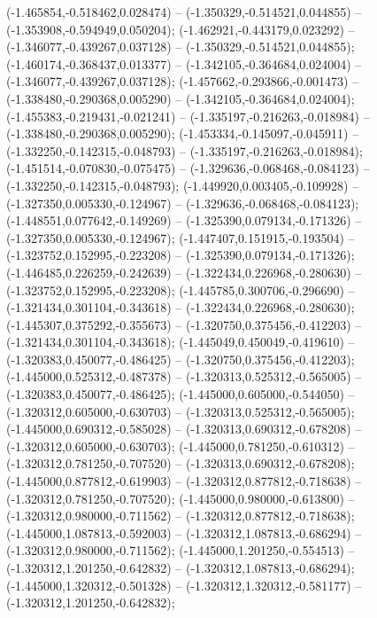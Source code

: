  (-1.465854,-0.518462,0.028474) -- (-1.350329,-0.514521,0.044855) -- (-1.353908,-0.594949,0.050204);
 (-1.462921,-0.443179,0.023292) -- (-1.346077,-0.439267,0.037128) -- (-1.350329,-0.514521,0.044855);
 (-1.460174,-0.368437,0.013377) -- (-1.342105,-0.364684,0.024004) -- (-1.346077,-0.439267,0.037128);
 (-1.457662,-0.293866,-0.001473) -- (-1.338480,-0.290368,0.005290) -- (-1.342105,-0.364684,0.024004);
 (-1.455383,-0.219431,-0.021241) -- (-1.335197,-0.216263,-0.018984) -- (-1.338480,-0.290368,0.005290);
 (-1.453334,-0.145097,-0.045911) -- (-1.332250,-0.142315,-0.048793) -- (-1.335197,-0.216263,-0.018984);
 (-1.451514,-0.070830,-0.075475) -- (-1.329636,-0.068468,-0.084123) -- (-1.332250,-0.142315,-0.048793);
 (-1.449920,0.003405,-0.109928) -- (-1.327350,0.005330,-0.124967) -- (-1.329636,-0.068468,-0.084123);
 (-1.448551,0.077642,-0.149269) -- (-1.325390,0.079134,-0.171326) -- (-1.327350,0.005330,-0.124967);
 (-1.447407,0.151915,-0.193504) -- (-1.323752,0.152995,-0.223208) -- (-1.325390,0.079134,-0.171326);
 (-1.446485,0.226259,-0.242639) -- (-1.322434,0.226968,-0.280630) -- (-1.323752,0.152995,-0.223208);
 (-1.445785,0.300706,-0.296690) -- (-1.321434,0.301104,-0.343618) -- (-1.322434,0.226968,-0.280630);
 (-1.445307,0.375292,-0.355673) -- (-1.320750,0.375456,-0.412203) -- (-1.321434,0.301104,-0.343618);
 (-1.445049,0.450049,-0.419610) -- (-1.320383,0.450077,-0.486425) -- (-1.320750,0.375456,-0.412203);
 (-1.445000,0.525312,-0.487378) -- (-1.320313,0.525312,-0.565005) -- (-1.320383,0.450077,-0.486425);
 (-1.445000,0.605000,-0.544050) -- (-1.320312,0.605000,-0.630703) -- (-1.320313,0.525312,-0.565005);
 (-1.445000,0.690312,-0.585028) -- (-1.320313,0.690312,-0.678208) -- (-1.320312,0.605000,-0.630703);
 (-1.445000,0.781250,-0.610312) -- (-1.320312,0.781250,-0.707520) -- (-1.320313,0.690312,-0.678208);
 (-1.445000,0.877812,-0.619903) -- (-1.320312,0.877812,-0.718638) -- (-1.320312,0.781250,-0.707520);
 (-1.445000,0.980000,-0.613800) -- (-1.320312,0.980000,-0.711562) -- (-1.320312,0.877812,-0.718638);
 (-1.445000,1.087813,-0.592003) -- (-1.320312,1.087813,-0.686294) -- (-1.320312,0.980000,-0.711562);
 (-1.445000,1.201250,-0.554513) -- (-1.320312,1.201250,-0.642832) -- (-1.320312,1.087813,-0.686294);
 (-1.445000,1.320312,-0.501328) -- (-1.320312,1.320312,-0.581177) -- (-1.320312,1.201250,-0.642832);
